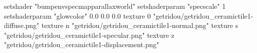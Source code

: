 setshader "bumpenvspecmapparallaxworld"
setshaderparam "specscale" 1
setshaderparam "glowcolor" 0.0 0.0 0.0
texture 0 "getridou/getridou_ceramictile1-diffuse.png"
texture n "getridou/getridou_ceramictile1-normal.png"
texture s "getridou/getridou_ceramictile1-specular.png"
texture z "getridou/getridou_ceramictile1-displacement.png"

